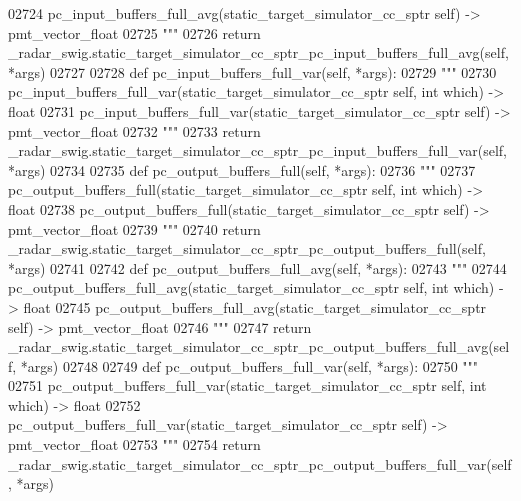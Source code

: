 \begin{DoxyCode}
{{{{{{{{{{02724 \textcolor{stringliteral}{        pc\_input\_buffers\_full\_avg(static\_target\_simulator\_cc\_sptr self) -> pmt\_vector\_float}
02725 \textcolor{stringliteral}{        """}
02726         \textcolor{keywordflow}{return} \_radar\_swig.static\_target\_simulator\_cc\_sptr\_pc\_input\_buffers\_full\_avg(self, *args)
02727 
02728     \textcolor{keyword}{def }pc_input_buffers_full_var(self, *args):
02729         \textcolor{stringliteral}{"""}
02730 \textcolor{stringliteral}{        pc\_input\_buffers\_full\_var(static\_target\_simulator\_cc\_sptr self, int which) -> float}
02731 \textcolor{stringliteral}{        pc\_input\_buffers\_full\_var(static\_target\_simulator\_cc\_sptr self) -> pmt\_vector\_float}
02732 \textcolor{stringliteral}{        """}
02733         \textcolor{keywordflow}{return} \_radar\_swig.static\_target\_simulator\_cc\_sptr\_pc\_input\_buffers\_full\_var(self, *args)
02734 
02735     \textcolor{keyword}{def }pc_output_buffers_full(self, *args):
02736         \textcolor{stringliteral}{"""}
02737 \textcolor{stringliteral}{        pc\_output\_buffers\_full(static\_target\_simulator\_cc\_sptr self, int which) -> float}
02738 \textcolor{stringliteral}{        pc\_output\_buffers\_full(static\_target\_simulator\_cc\_sptr self) -> pmt\_vector\_float}
02739 \textcolor{stringliteral}{        """}
02740         \textcolor{keywordflow}{return} \_radar\_swig.static\_target\_simulator\_cc\_sptr\_pc\_output\_buffers\_full(self, *args)
02741 
02742     \textcolor{keyword}{def }pc_output_buffers_full_avg(self, *args):
02743         \textcolor{stringliteral}{"""}
02744 \textcolor{stringliteral}{        pc\_output\_buffers\_full\_avg(static\_target\_simulator\_cc\_sptr self, int which) -> float}
02745 \textcolor{stringliteral}{        pc\_output\_buffers\_full\_avg(static\_target\_simulator\_cc\_sptr self) -> pmt\_vector\_float}
02746 \textcolor{stringliteral}{        """}
02747         \textcolor{keywordflow}{return} \_radar\_swig.static\_target\_simulator\_cc\_sptr\_pc\_output\_buffers\_full\_avg(self, *args)
02748 
02749     \textcolor{keyword}{def }pc_output_buffers_full_var(self, *args):
02750         \textcolor{stringliteral}{"""}
02751 \textcolor{stringliteral}{        pc\_output\_buffers\_full\_var(static\_target\_simulator\_cc\_sptr self, int which) -> float}
02752 \textcolor{stringliteral}{        pc\_output\_buffers\_full\_var(static\_target\_simulator\_cc\_sptr self) -> pmt\_vector\_float}
02753 \textcolor{stringliteral}{        """}
02754         \textcolor{keywordflow}{return} \_radar\_swig.static\_target\_simulator\_cc\_sptr\_pc\_output\_buffers\_full\_var(self, *args)
}}}}}}}}}}
\end{DoxyCode}
